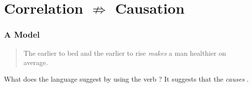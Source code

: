 \documentclass[slides]{beamer} %
\begin{document}
\begin{frame}\frametitle{}

	
\end{frame}

\section{Correlation  $\not \Rightarrow$  Causation}

\begin{frame}\frametitle{A  Model}

\begin{quotation}
The earlier to bed and the earlier to rise \emph{makes} a man healthier on average.
\end{quotation}

What does the language suggest by using the verb ? It suggests that the  \textit{causes} .
	
\end{frame}

\begin{frame}\frametitle{}

	
\end{frame}

\begin{frame}\frametitle{}

	
\end{frame}

\begin{frame}\frametitle{}

	
\end{frame}

\begin{frame}\frametitle{}

	
\end{frame}

\begin{frame}\frametitle{}

	
\end{frame}

\begin{frame}\frametitle{}

	
\end{frame}

\begin{frame}\frametitle{}

	
\end{frame}
\end{document}
